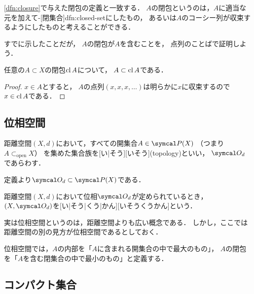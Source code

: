 \documentclass[../sotsu.tex]{subfiles}
\begin{document}
\cref{dfn:closure}で与えた閉包の定義と一致する．
$A$の閉包というのは，$A$に適当な元を加えて-[閉集合]{dfn:closed-set}にしたもの，
あるいは$A$のコーシー列が収束するようにしたものと考えることができる．

すでに示したことだが，
$A$の閉包が$A$を含むことを，
点列のことばで証明しよう．

\begin{corollary}
    任意の$A \subset X$の閉包$\operatorname{cl}{A}$について，
    $A \subset \operatorname{cl}{A}$である．
\end{corollary}

\begin{proof}
    $x \in A$とすると，
    $A$の点列$(x, x, x, \dotsc)$は明らかに$x$に収束するので$x \in \operatorname{cl}{A}$である．
\end{proof}



\subsection{位相空間}

\begin{definition}
    \label{dfn:topology}
    距離空間$(X, d)$において，すべての開集合$A \in \pset(X)$
    （つまり$A \subset_{\text{open}} X$）
    を集めた集合族を[い|そう][いそう](topology)といい，
    $\topology_d$であらわす．
\end{definition}

定義より$\topology_d \subset \pset(X)$である．

\begin{definition}
    \label{dfn:topological-space}
    距離空間$(X, d)$において位相$\topology_d$が定められているとき，
    $(X, \topology_d)$を[い|そう|くう|かん][いそうくうかん]という．
\end{definition}

実は位相空間というのは，距離空間よりも広い概念である．
しかし，ここでは距離空間の別の見方が位相空間であるとしておく．

位相空間では，$A$の内部を「$A$に含まれる開集合の中で最大のもの」，
$A$の閉包を「$A$を含む閉集合の中で最小のもの」と定義する．




\subsection{コンパクト集合}

\end{document}
